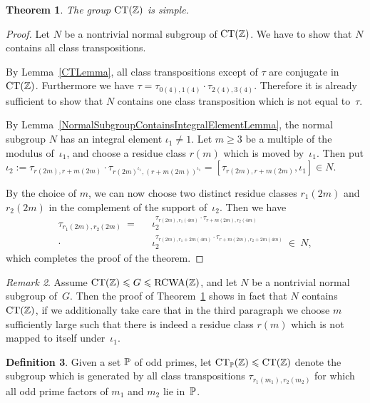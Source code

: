 \documentclass{amsart}
\theoremstyle{definition} \newtheorem{CTZDefinition}{Definition}[section]
\theoremstyle{plain}      \newtheorem{CTZPropertiesTheorem}[CTZDefinition]{Theorem}
\theoremstyle{plain}      \newtheorem{CTZSubgroupsTheorem}[CTZDefinition]{Theorem}
\theoremstyle{definition} \newtheorem{RcwaMappingDefinition}{Definition}[section]
\theoremstyle{definition} \newtheorem{RCWADefinition}[RcwaMappingDefinition]{Definition}
\theoremstyle{plain}      \newtheorem{CTZNotFinitelyGeneratedTheorem}
\theoremstyle{definition} \newtheorem{CTZSmEmbeddingDefinition}[RcwaMappingDefinition]{Definition}
\theoremstyle{plain}      \newtheorem{CTZHighlyTransitiveTheorem}[RcwaMappingDefinition]{Theorem}
\theoremstyle{plain}      \newtheorem{CTZTorsionElementsDivisibleTheorem}
\theoremstyle{plain}      \newtheorem{CTLemma}{Lemma}[section]
\theoremstyle{plain}      \newtheorem{IntegralCommutatorLemma}[CTLemma]{Lemma}
\theoremstyle{plain}      \newtheorem{NormalSubgroupContainsIntegralElementLemma}[CTLemma]{Lemma}
\theoremstyle{plain}      \newtheorem{CTZSimpleTheorem}[CTLemma]{Theorem}
\theoremstyle{remark}     \newtheorem{CTZSimpleRemark}[CTLemma]{Remark}
\theoremstyle{definition} \newtheorem{CTPZDefinition}[CTLemma]{Definition}
\theoremstyle{plain}      \newtheorem{CTPZSimpleCorollary}[CTLemma]{Corollary}
\theoremstyle{plain}      \newtheorem{CTPZSimpleProblem}[CTLemma]{Problem}
\theoremstyle{plain}      \newtheorem{FnPSL2ZEmbeddingTheorem}{Theorem}[section]
\theoremstyle{plain}      \newtheorem{FreeProductEmbeddingTheorem}[FnPSL2ZEmbeddingTheorem]{Theorem}
\theoremstyle{definition} \newtheorem{RestrictionMonomorphismDefinition}
\theoremstyle{plain}      \newtheorem{DirectAndWreathProductsEmbeddingTheorem}
\theoremstyle{plain}      \newtheorem{DirectAndWreathProductsEmbeddingCorollary}
\theoremstyle{definition} \newtheorem{CTintZDefinition}[FnPSL2ZEmbeddingTheorem]{Definition}
\theoremstyle{plain}      \newtheorem{CTintZSimpleTheorem}[FnPSL2ZEmbeddingTheorem]{Theorem}
\theoremstyle{definition} \newtheorem{KernelDefinition}{Definition}[section]
\theoremstyle{definition} \newtheorem{TameWildDefinition}[KernelDefinition]{Definition}
\theoremstyle{definition} \newtheorem{SimpleSupergroupsDefinition}[KernelDefinition]{Definition}
\theoremstyle{definition} \newtheorem{CSCRDefinition}[KernelDefinition]{Definition}
\theoremstyle{plain}      \newtheorem{SimpleSupergroupsGeneratorsTheorem}[KernelDefinition]{Theorem}
\theoremstyle{plain}      \newtheorem{SimpleSupergroupsTheorem}[KernelDefinition]{Theorem}
\theoremstyle{plain}      \newtheorem{SimpleSupergroupsTransitivityTheorem}
\theoremstyle{plain}      \newtheorem{TameGenerationConjecture}[KernelDefinition]{Conjecture}
\theoremstyle{remark}     \newtheorem{TameGenerationRemark}[KernelDefinition]{Remark}
\begin{document}
\begin{CTZSimpleTheorem} \label{CTZSimpleTheorem}
  The group \(\CT{\ZZ}\) is simple.
\end{CTZSimpleTheorem}
\begin{proof}
  Let \(N\) be a nontrivial normal subgroup of \(\CT{\ZZ}\).
  We have to show that \(N\) contains all class transpositions.

  By Lemma~\ref{CTLemma}, all class transpositions except of \(\tau\) are conjugate in \(\CT{\ZZ}\).
  Furthermore we have \(\tau = \tau_{0(4),1(4)} \cdot \tau_{2(4),3(4)}\). Therefore it is already
  sufficient to show that \(N\) contains one class transposition which is not equal to~\(\tau\).

  By Lemma~\ref{NormalSubgroupContainsIntegralElementLemma}, the normal subgroup \(N\) has
  an integral element \(\iota_1 \neq 1\). Let \(m \geq 3\) be a multiple of the modulus
  of~\(\iota_1\), and choose a residue class \(r(m)\) which is moved by~\(\iota_1\). Then
  put \(\iota_2 := \tau_{r(2m),r+m(2m)} \cdot \tau_{r(2m)^{\iota_1},(r+m(2m))^{\iota_1}} =
  [\tau_{r(2m),r+m(2m)},\iota_1] \in N\).

  By the choice of \(m\), we can now choose two distinct residue classes \(r_1(2m)\) and
  \(r_2(2m)\) in the complement of the support of~\(\iota_2\). Then we have
  \begin{align*}
    \tau_{r_1(2m),r_2(2m)} \ = \ \ \
              &\iota_2^{\tau_{r(2m),r_1(4m)}    \cdot \tau_{r+m(2m),r_2(4m)}} \\
      \cdot \ &\iota_2^{\tau_{r(2m),r_1+2m(4m)} \cdot \tau_{r+m(2m),r_2+2m(4m)}} \ \in \ N,
  \end{align*}
  which completes the proof of the theorem.
\end{proof}

\begin{CTZSimpleRemark} \label{CTZSimpleRemark}
  Assume \(\CT{\ZZ} \leq G \leq \RCWA{\ZZ}\), and let \(N\) be a nontrivial normal subgroup
  of~\(G\). Then the proof of Theorem~\ref{CTZSimpleTheorem} shows in fact that \(N\)
  contains~\(\CT{\ZZ}\), if we additionally take care that in the third paragraph we
  choose \(m\) sufficiently large such that there is indeed a residue class \(r(m)\) which
  is not mapped to itself under~\(\iota_1\).
\end{CTZSimpleRemark}

\begin{CTPZDefinition} \label{CTPZDefinition}
  Given a set \(\mathbb{P}\) of odd primes, let \(\CTP{\ZZ} \leq \CT{\ZZ}\) denote the subgroup which
  is generated by all class transpositions \(\tau_{r_1(m_1),r_2(m_2)}\) for which all odd prime
  factors of \(m_1\) and \(m_2\) lie in~\(\mathbb{P}\).
\end{CTPZDefinition}
\end{document}
